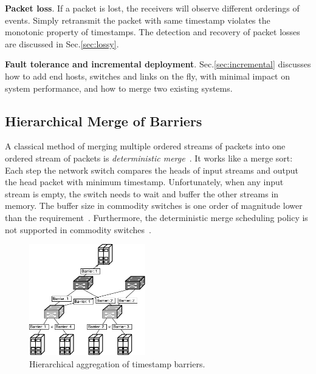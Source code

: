 \textbf{Packet loss}.
If a packet is lost, the receivers will observe different orderings of events. Simply retransmit the packet with same timestamp violates the monotonic property of timestamps. The detection and recovery of packet losses are discussed in Sec.\ref{sec:lossy}.

\textbf{Fault tolerance and incremental deployment}.
Sec.\ref{sec:incremental} discusses how to add end hosts, switches and links on the fly, with minimal impact on system performance, and how to merge two existing \sys systems.



\subsection{Hierarchical Merge of Barriers}
\label{sec:ideal}

A classical method of merging multiple ordered streams of packets into one ordered stream of packets is \textit{deterministic merge}~\cite{hadzilacos1994modular, aguilera2000efficient}. It works like a merge sort: Each step the network switch compares the heads of input streams and output the head packet with minimum timestamp. %
Unfortunately, when any input stream is empty, the switch needs to wait and buffer the other streams in memory.
The buffer size in commodity switches is one order of magnitude lower than the requirement~\cite{bai2017congestion}.
Furthermore, the deterministic merge scheduling policy is not supported in commodity switches~\cite{sivaraman2015towards,sivaraman2016programmable}.


\begin{figure}[t]
\centering
\includegraphics[width=0.45\textwidth]{images/hierarchical_merge.pdf}
\caption{Hierarchical aggregation of timestamp barriers.}
\label{fig:hierarchical_merge}
\vspace{-0.9em}
\end{figure}

